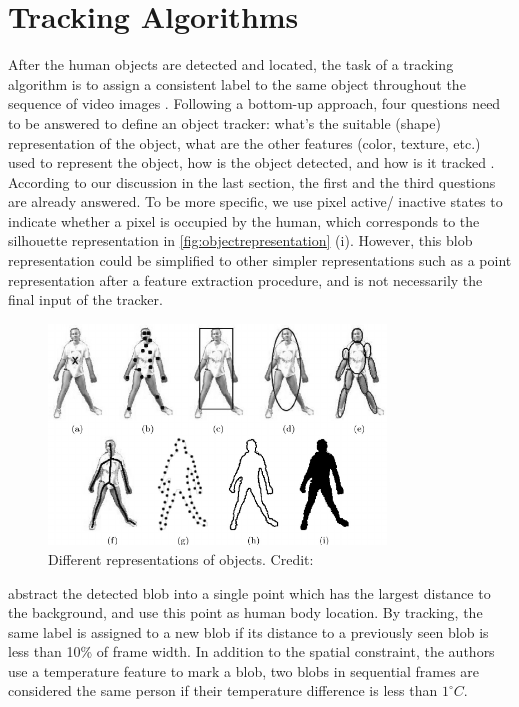 \section{Tracking Algorithms}
After the human objects are detected and located, the task of a tracking algorithm is to assign a consistent label to the same object throughout the sequence of video images \cite{tang2010hybrid}. Following a bottom-up approach, four questions need to be answered to define an object tracker: what's the suitable (shape) representation of the object, what are the other features (color, texture, etc.) used to represent the object, how is the object detected, and how is it tracked \cite{trackingsurvey}. According to our discussion in the last section, the first and the third questions are already answered. To be more specific, we use pixel active/ inactive states to indicate whether a pixel is occupied by the human, which corresponds to the silhouette representation in \autoref{fig:objectrepresentation} (i). However, this blob representation could be simplified to other simpler representations such as a point representation after a feature extraction procedure, and is not necessarily the final input of the tracker.
\begin{figure}
  \centering
  \includegraphics[width=0.8\textwidth]{figures/Object-representations.png}
  \caption{Different representations of objects. Credit: \cite{trackingsurvey}}\label{fig:objectrepresentation}
\end{figure}

\citeauthor{firstflow} \cite{firstflow} abstract the detected blob into a single point which has the largest distance to the background, and use this point as human body location. By tracking, the same label is assigned to a new blob if its distance to a previously seen blob is less than 10\% of frame width. In addition to the spatial constraint, the authors use a temperature feature to mark a blob, two blobs in sequential frames are considered the same person if their temperature difference is less than $1^\circ C$.

